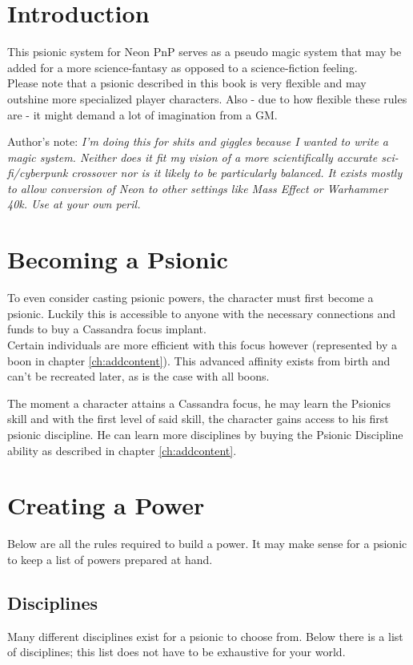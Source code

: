 \documentclass[12pt,a4paper,openany]{book}
\begin{document}
	

	\chapter{Introduction}
	This psionic system for Neon PnP serves as a pseudo magic system that may be added for a more science-fantasy as opposed to a science-fiction feeling.\\
	Please note that a psionic described in this book is very flexible and may outshine more specialized player characters. Also - due to how flexible these rules are - it might demand a lot of imagination from a GM.

	Author's note: \emph{I'm doing this for shits and giggles because I wanted to write a magic system. Neither does it fit my vision of a more scientifically accurate sci-fi/cyberpunk crossover nor is it likely to be particularly balanced. It exists mostly to allow conversion of Neon to other settings like Mass Effect or Warhammer 40k. Use at your own peril.}

	\chapter{Becoming a Psionic}
	To even consider casting psionic powers, the character must first become a psionic. Luckily this is accessible to anyone with the necessary connections and funds to buy a Cassandra focus implant.\\
	Certain individuals are more efficient with this focus however (represented by a boon in chapter \ref{ch:addcontent}). This advanced affinity exists from birth and can't be recreated later, as is the case with all boons. \par
	The moment a character attains a Cassandra focus, he may learn the Psionics skill and with the first level of said skill, the character gains access to his first psionic discipline. He can learn more disciplines by buying the Psionic Discipline ability as described in chapter \ref{ch:addcontent}.

	\chapter{Creating a Power}
	\label{ch:create}
	Below are all the rules required to build a power. It may make sense for a psionic to keep a list of powers prepared at hand.
	\section{Disciplines}
	Many different disciplines exist for a psionic to choose from. Below there is a list of disciplines; this list does not have to be exhaustive for your world.
\end{document}
